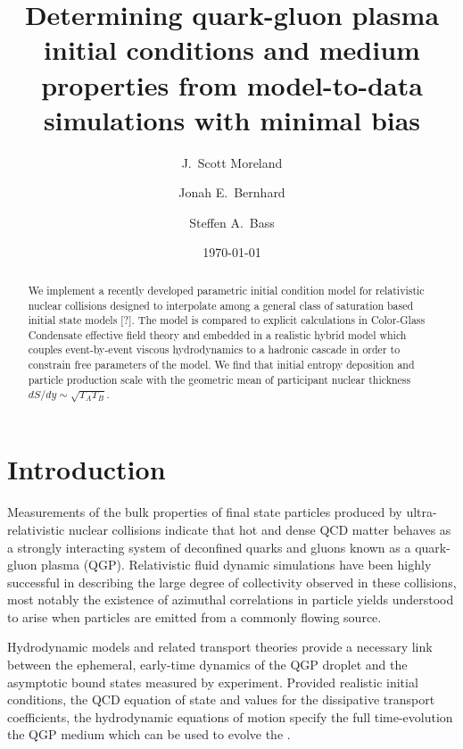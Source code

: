 \documentclass[aps,prc,reprint,amsmath]{revtex4-1}
\begin{document}
\title{Determining quark-gluon plasma initial conditions and medium \\ properties from model-to-data simulations with minimal bias}

\author{J.\ Scott Moreland}
\author{Jonah E.\ Bernhard}
\author{Steffen A.\ Bass}

\date{\today}


\begin{abstract}
  We implement a recently developed parametric initial condition model for relativistic nuclear collisions designed to interpolate among a general class of saturation based initial state models [?]. The model is compared to explicit calculations in Color-Glass Condensate effective field theory and embedded in a realistic hybrid model which couples event-by-event viscous hydrodynamics to a hadronic cascade in order to constrain free parameters of the model. We find that initial entropy deposition and particle production scale with the geometric mean of participant nuclear thickness $dS/dy \sim \sqrt{T_A T_B}$. 
\end{abstract}


\maketitle


\section{Introduction}

Measurements of the bulk properties of final state particles produced by ultra-relativistic nuclear collisions indicate that hot and dense QCD matter behaves as a 
strongly interacting system of deconfined quarks and gluons known as a quark-gluon plasma (QGP). Relativistic fluid dynamic simulations have been highly successful
in describing the large degree of collectivity observed in these collisions, most notably the existence of azimuthal correlations in particle yields understood to arise
when particles are emitted from a commonly flowing source.

Hydrodynamic models and related transport theories provide a necessary link between the ephemeral, early-time dynamics of the QGP droplet and the asymptotic 
bound states measured by experiment. Provided realistic initial conditions, the QCD equation of state and values for the dissipative transport coefficients, the hydrodynamic equations of motion specify the full time-evolution the QGP medium which can be used to evolve the .
\end{document}
